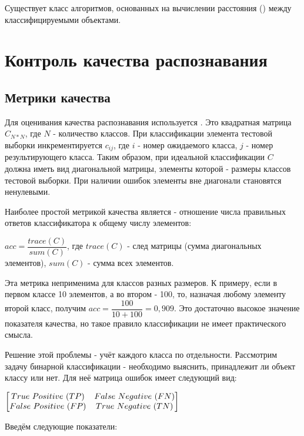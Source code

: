 Существует класс алгоритмов, основанных на вычислении расстояния () между классифицируемыми объектами. 






\section{Контроль качества распознавания}

\subsection{Метрики качества}

Для оценивания качества распознавания используется . Это квадратная матрица $C_{N*N}$, где $N$ - количество классов. При классификации элемента тестовой выборки инкрементируется $c_{ij}$, где $i$ - номер ожидаемого класса, $j$ - номер результирующего класса. Таким образом, при идеальной классификации $C$ должна иметь вид диагональной матрицы, элементы которой - размеры классов тестовой выборки. При наличии ошибок элементы вне диагонали становятся ненулевыми.


Наиболее простой метрикой качества является  - отношение числа правильных ответов классификатора к общему числу элементов:

$acc=\dfrac{trace(C)}{sum(C)}$, где $trace(C)$ - след матрицы (сумма диагональных элементов), $sum(C)$ - сумма всех элементов.

Эта метрика неприменима для классов разных размеров. К примеру, если в первом классе 10 элементов, а во втором - 100, то, назначая любому элементу второй класс, получим $acc=\dfrac{100}{10+100}=0,909$. Это достаточно высокое значение показателя качества, но такое правило классификации не имеет практического смысла.

Решение этой проблемы - учёт каждого класса по отдельности. Рассмотрим задачу бинарной классификации - необходимо выяснить, принадлежит ли объект классу или нет. Для неё матрица ошибок имеет следующий вид:

$\begin{bmatrix} True~Positive~(TP)  & False~Negative~(FN) \\ False~Positive~(FP) & True~Negative~(TN) \\ \end{bmatrix}$

Введём следующие показатели:

